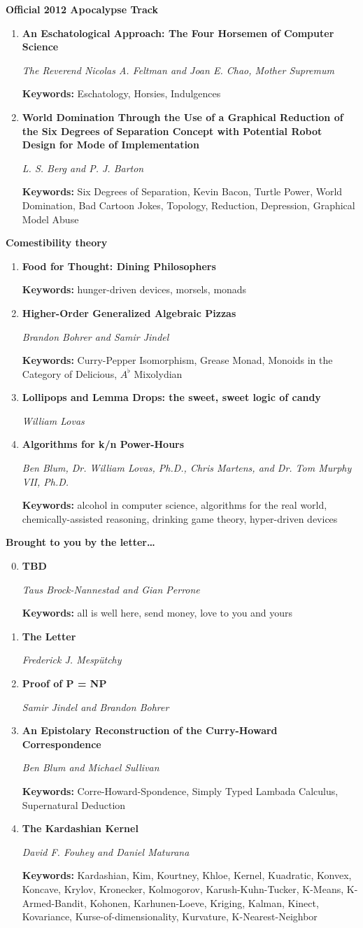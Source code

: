 \documentclass[letter]{article}
\newcommand\track[2]{\center {\Large \bf \em \sc Track #1} \vspace{0.2in}

{\huge \bf #2} \vspace{0.15in}
\thispagestyle{empty}}
\newcommand\asdf[2]{\vspace{0.15in} \item {\Large \bf \sf #1}

{\large \em #2}}
\newcommand\keywords[1]{

{\small {\bf Keywords:} #1}}
\begin{document}
\track{1}{Official 2012 Apocalypse Track}

\begin{enumerate}
\asdf{An Eschatological Approach: The Four Horsemen of Computer Science}
{The Reverend Nicolas A. Feltman and Joan E. Chao, Mother Supremum}
\keywords{Eschatology, Horsies, Indulgences}
\asdf{World Domination Through the Use of a Graphical Reduction of the Six Degrees of Separation Concept with Potential Robot Design for Mode of Implementation}
{L. S. Berg and P. J. Barton}
\keywords{Six Degrees of Separation, Kevin Bacon, Turtle Power, World Domination, Bad Cartoon Jokes, Topology, Reduction, Depression, Graphical Model Abuse}
\end{enumerate}

\newpage

\track{2}{Comestibility theory}

\begin{enumerate}
\asdf{Food for Thought: Dining Philosophers}{}
\keywords{hunger-driven devices, morsels, monads}
\asdf{Higher-Order Generalized Algebraic Pizzas}
{Brandon Bohrer and Samir Jindel}
\keywords{Curry-Pepper Isomorphism, Grease Monad, Monoids in the Category of Delicious, $A^\flat$ Mixolydian}
\vspace{-0.1in}
\asdf{Lollipops and Lemma Drops: the sweet, sweet logic of candy}
{William Lovas}
\asdf{Algorithms for k/n Power-Hours}
{Ben Blum, Dr. William Lovas, Ph.D., Chris Martens, and Dr. Tom Murphy VII, Ph.D.}
\keywords{alcohol in computer science, algorithms for the real world, chemically-assisted reasoning, drinking game theory, hyper-driven devices}
\end{enumerate}

\newpage

\track{3}{Brought to you by the letter\dots}

\begin{enumerate}
\setcounter{enumi}{-1}
\asdf{TBD}
{Taus Brock-Nannestad and Gian Perrone}
\keywords{all is well here, send money, love to you and yours}
\asdf{The Letter}
{Frederick J. Mesp\"{u}tchy}
\asdf{Proof of P = NP}
{Samir Jindel and Brandon Bohrer}
\asdf{An Epistolary Reconstruction of the Curry-Howard Correspondence}
{Ben Blum and Michael Sullivan}
\keywords{Corre-Howard-Spondence, Simply Typed Lambada Calculus, Supernatural Deduction}
\asdf{The Kardashian Kernel}
{David F. Fouhey and Daniel Maturana}
\keywords{Kardashian, Kim, Kourtney, Khloe, Kernel, Kuadratic, Konvex, Koncave, Krylov, Kronecker, Kolmogorov, Karush-Kuhn-Tucker, K-Means, K-Armed-Bandit, Kohonen, Karhunen-Loeve, Kriging, Kalman, Kinect, Kovariance, Kurse-of-dimensionality, Kurvature, K-Nearest-Neighbor}
\end{enumerate}
\end{document}
